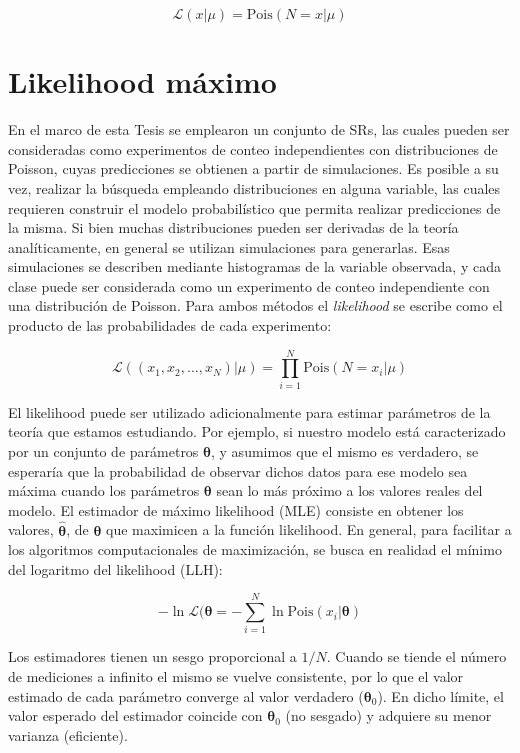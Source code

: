 \begin{equation}
	\mathcal{L}(x|\mu) = \text{Pois}(N=x|\mu) 
\end{equation}

\section{Likelihood máximo}

En el marco de esta Tesis se emplearon un conjunto de SRs, las cuales pueden ser consideradas como experimentos de conteo independientes con distribuciones de Poisson, cuyas predicciones se obtienen a partir de simulaciones. 
Es posible a su vez, realizar la búsqueda empleando distribuciones en alguna variable, las cuales requieren construir el modelo probabilístico que permita realizar predicciones de la misma. Si bien muchas distribuciones pueden ser derivadas de la teoría analíticamente, en general se utilizan simulaciones para generarlas. Esas simulaciones se describen mediante histogramas de la variable observada, y cada clase puede ser considerada como un experimento de conteo independiente con una distribución de Poisson. 
Para ambos métodos el \textit{likelihood} se escribe como el producto de las probabilidades de cada experimento:


\begin{equation}
	\mathcal{L}((x_1,x_2,...,x_N)|\mu) = \prod_{i=1}^N \text{Pois}(N=x_i|\mu) 
\end{equation}


El likelihood puede ser utilizado adicionalmente para estimar parámetros de la teoría que estamos estudiando. Por ejemplo, si nuestro modelo está caracterizado por un conjunto de parámetros $\bm{\theta}$, y asumimos que el mismo es verdadero, se esperaría que la probabilidad de observar dichos datos para ese modelo sea máxima cuando los parámetros $\bm{\theta}$ sean lo más próximo a los valores reales del modelo. El estimador de máximo likelihood (MLE) consiste en obtener los valores, $\hat{\bm{\theta}}$, de $\bm{\theta}$ que maximicen a la función likelihood. En general, para facilitar a los algoritmos computacionales de maximización, se busca en realidad el mínimo del logaritmo del likelihood (LLH):

\begin{equation}
	-\ln{\mathcal{L}(\bm{\theta}} = - \sum_{i=1}^{N}\ln{\text{Pois}(x_i|\bm{\theta})}
\end{equation}

Los estimadores tienen un sesgo proporcional a $1/N$. Cuando se tiende el número de mediciones a infinito el mismo se vuelve consistente, por lo que el valor estimado de cada parámetro converge al valor verdadero ($\bm{\theta}_0$). En dicho límite, el valor esperado del estimador coincide con $\bm{\theta}_0$ (no sesgado) y adquiere su menor varianza (eficiente).




